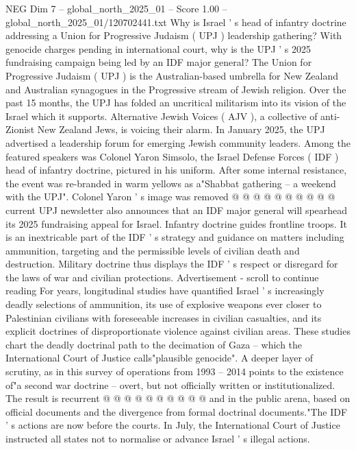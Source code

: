 \begin{textsample}{NEG Dim 7 – global\_north\_2025\_01 – Score 1.00 – global\_north\_2025\_01/120702441.txt}  \label{ex:f7_neg_187}
Why is Israel ' s head of infantry doctrine addressing a Union for Progressive Judaism ( UPJ ) leadership gathering?
With genocide charges pending in international court, why is the UPJ ' s 2025 fundraising campaign being led by an IDF major general?
The Union for Progressive Judaism ( UPJ ) is the Australian-based umbrella for New Zealand and Australian synagogues in the Progressive stream of Jewish religion.
Over the past 15 months, the UPJ has folded an uncritical militarism into its vision of the Israel which it supports.
Alternative Jewish Voices ( AJV ), a collective of anti-Zionist New Zealand Jews, is voicing their alarm.
In January 2025, the UPJ advertised a leadership forum for emerging Jewish community leaders.
Among the featured speakers was Colonel Yaron Simsolo, the Israel Defense Forces ( IDF ) head of infantry doctrine, pictured in his uniform.
After some internal resistance, the event was re-branded in warm yellows as a"Shabbat gathering -- a weekend with the UPJ".
Colonel Yaron ' s image was removed @ @ @ @ @ @ @ @ @ @ current UPJ newsletter also announces that an IDF major general will spearhead its 2025 fundraising appeal for Israel.
Infantry doctrine guides frontline troops.
It is an inextricable part of the IDF ' s strategy and guidance on matters including ammunition, targeting and the permissible levels of civilian death and destruction.
Military doctrine thus displays the IDF ' s respect or disregard for the laws of war and civilian protections.
Advertisement - scroll to continue reading For years, longitudinal studies have quantified Israel ' s increasingly deadly selections of ammunition, its use of explosive weapons ever closer to Palestinian civilians with foreseeable increases in civilian casualties, and its explicit doctrines of disproportionate violence against civilian areas.
These studies chart the deadly doctrinal path to the decimation of Gaza -- which the International Court of Justice calls"plausible genocide".
A deeper layer of scrutiny, as in this survey of operations from 1993 -- 2014 points to the existence of"a second war doctrine -- overt, but not officially written or institutionalized.
The result is recurrent @ @ @ @ @ @ @ @ @ @ and in the public arena, based on official documents and the divergence from formal doctrinal documents."The IDF ' s actions are now before the courts.
In July, the International Court of Justice instructed all states not to normalise or advance Israel ' s illegal actions.

\end{textsample}
